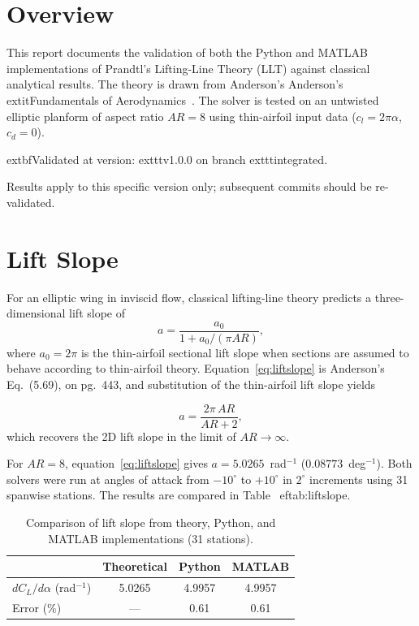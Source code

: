 \documentclass[11pt,letter]{ejlnotes}
\newcommand{\validationcommit}{v1.0.0}
\begin{document}
	\thispagestyle{fancy}
	
	{\bodyfont  %

		\section*{Overview}

		This report documents the validation of both the Python and MATLAB
		implementations of Prandtl's Lifting-Line Theory (LLT) against
		classical analytical results.  The theory is drawn from Anderson's
		Anderson's 	extit{Fundamentals of Aerodynamics}~\cite[Chapter~5]{Anderson2011}.
		The solver is tested on an untwisted elliptic planform of aspect
		ratio $AR = 8$ using thin-airfoil input data
		($c_l = 2\pi\alpha$, $c_d = 0$).

		\noindent	extbf{Validated at version:} 	exttt{\validationcommit}
		on branch 	exttt{integrated}.\par
		Results apply to this specific version only; subsequent commits
		should be re-validated.

		\section*{Lift Slope}

		For an elliptic wing in inviscid flow, classical lifting-line theory
		predicts a three-dimensional lift slope of
		\begin{equation}
			a = \frac{a_0}{1 + a_0 / (\pi AR)},
			\label{eq:liftslope}
		\end{equation}
		where $a_0 = 2\pi$ is the thin-airfoil sectional lift slope when
		sections are assumed to behave according to thin-airfoil theory.
		Equation~\eqref{eq:liftslope} is Anderson's Eq.~(5.69),
		on pg.~443, and substitution of the thin-airfoil lift slope yields
		
		\begin{equation}
			a = \frac{2 \pi \, AR}{AR + 2},
		\end{equation}
		which recovers the 2D lift slope in the limit of $AR \rightarrow \infty$.

		For $AR = 8$, equation~\eqref{eq:liftslope} gives
		$a = 5.0265$~rad$^{-1}$ ($0.08773$~deg$^{-1}$).
		Both solvers were run at angles of attack from $-10^\circ$ to
		$+10^\circ$ in $2^\circ$ increments using 31 spanwise stations.
				The results are compared in Table~
ef{tab:liftslope}.

		\begin{table}[htbp]
			\centering
			\caption{Comparison of lift slope from theory, Python, and MATLAB implementations (31 stations).}
			\label{tab:liftslope}
			\begin{tabular}{lccc}
				\toprule
				& Theoretical & Python & MATLAB \\
				\midrule
				$dC_L/d\alpha$ (rad$^{-1}$) & 5.0265 & 4.9957 & 4.9957 \\
				Error (\%) & --- & 0.61 & 0.61 \\
				\bottomrule
			\end{tabular}
		\end{table}

}
\end{document}
